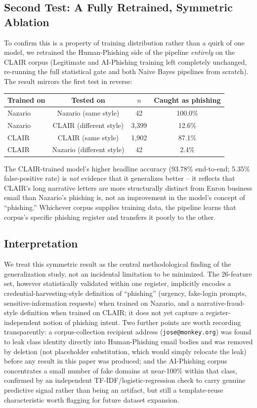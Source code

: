 \documentclass[11pt]{article}
\begin{document}
\subsection{Second Test: A Fully Retrained, Symmetric Ablation}
To confirm this is a property of training distribution rather than a quirk of one model, we
retrained the Human-Phishing side of the pipeline \emph{entirely} on the CLAIR corpus (Legitimate
and AI-Phishing training left completely unchanged, re-running the full statistical gate and both
Naive Bayes pipelines from scratch). The result mirrors the first test in reverse:
\begin{center}
\begin{tabular}{@{}lccc@{}}
\toprule
Trained on & Tested on & $n$ & Caught as phishing \\
\midrule
Nazario & Nazario (same style) & 42 & 100.0\% \\
Nazario & CLAIR (different style) & 3{,}399 & 12.6\% \\
CLAIR & CLAIR (same style) & 1{,}902 & 87.1\% \\
CLAIR & Nazario (different style) & 42 & 2.4\% \\
\bottomrule
\end{tabular}
\end{center}
The CLAIR-trained model's higher headline accuracy (93.78\% end-to-end; 5.35\% false-positive
rate) is \emph{not} evidence that it generalizes better -- it reflects that CLAIR's long narrative
letters are more structurally distinct from Enron business email than Nazario's phishing is, not
an improvement in the model's concept of ``phishing.'' Whichever corpus supplies training data,
the pipeline learns that corpus's specific phishing register and transfers it poorly to the other.

\subsection{Interpretation}
\label{sec:limitations}
We treat this symmetric result as the central methodological finding of the generalization study,
not an incidental limitation to be minimized. The 26-feature set, however statistically validated
within one register, implicitly encodes a credential-harvesting-style definition of ``phishing''
(urgency, fake-login prompts, sensitive-information requests) when trained on Nazario, and a
narrative-fraud-style definition when trained on CLAIR; it does not yet capture a
register-independent notion of phishing intent. Two further points are worth recording
transparently: a corpus-collection recipient address (\texttt{jose@monkey.org}) was found to leak
class identity directly into Human-Phishing email bodies and was removed by deletion (not
placeholder substitution, which would simply relocate the leak) before any result in this paper
was produced; and the AI-Phishing corpus concentrates a small number of fake domains at near-100\%
within that class, confirmed by an independent TF-IDF/logistic-regression check to carry genuine
predictive signal rather than being an artifact, but still a template-reuse characteristic worth
flagging for future dataset expansion.
\end{document}
